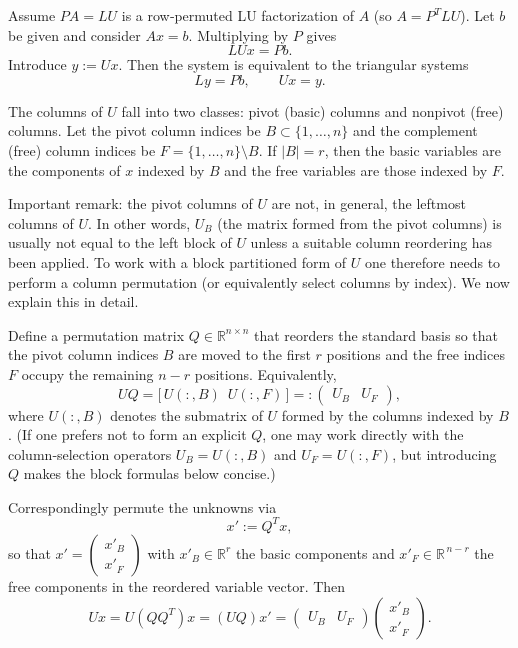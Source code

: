 \documentclass{article}
\begin{document}
Assume \(PA=LU\) is a row‑permuted LU factorization of \(A\) (so \(A=P^{T}LU\)). Let \(b\) be given and consider \(Ax=b\). Multiplying by \(P\) gives
\[
LUx=Pb.
\]
Introduce \(y:=Ux\). Then the system is equivalent to the triangular systems
\[
Ly=Pb,\qquad Ux=y.
\]

The columns of \(U\) fall into two classes: pivot (basic) columns and nonpivot (free) columns. Let the pivot column indices be \(B\subset\{1,\dots,n\}\) and the complement (free) column indices be \(F=\{1,\dots,n\}\setminus B\). If \(|B|=r\), then the basic variables are the components of \(x\) indexed by \(B\) and the free variables are those indexed by \(F\).

Important remark: the pivot columns of \(U\) are not, in general, the leftmost columns of \(U\). In other words, \(U_B\) (the matrix formed from the pivot columns) is usually not equal to the left block of \(U\) unless a suitable column reordering has been applied. To work with a block partitioned form of \(U\) one therefore needs to perform a column permutation (or equivalently select columns by index). We now explain this in detail.

Define a permutation matrix \(Q\in\mathbb{R}^{n\times n}\) that reorders the standard basis so that the pivot column indices \(B\) are moved to the first \(r\) positions and the free indices \(F\) occupy the remaining \(n-r\) positions. Equivalently,
\[
UQ = \bigl[\,U(:,B)\ \; U(:,F)\,\bigr] =: \begin{pmatrix}U_B & U_F\end{pmatrix},
\]
where \(U(:,B)\) denotes the submatrix of \(U\) formed by the columns indexed by \(B\). (If one prefers not to form an explicit \(Q\), one may work directly with the column‑selection operators \(U_B=U(:,B)\) and \(U_F=U(:,F)\), but introducing \(Q\) makes the block formulas below concise.)

Correspondingly permute the unknowns via
\[
x' := Q^{T}x,
\]
so that \(x' = \begin{pmatrix}x'_B\\ x'_F\end{pmatrix}\) with \(x'_B\in\mathbb{R}^{r}\) the basic components and \(x'_F\in\mathbb{R}^{\,n-r}\) the free components in the reordered variable vector. Then
\[
Ux = U(QQ^{T})x = (UQ)x' = \begin{pmatrix}U_B & U_F\end{pmatrix}\begin{pmatrix}x'_B\\[2pt] x'_F\end{pmatrix}.
\]
\end{document}
